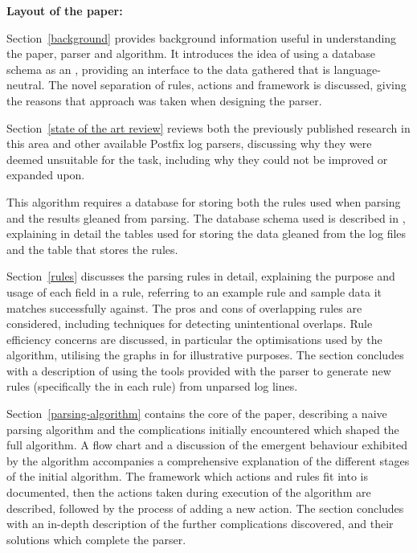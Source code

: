 \vspace{1em}\noindent\textbf{Layout of the paper:}

Section~\ref{background} provides background information useful in
understanding the paper, parser and algorithm.  It introduces the idea of
using a database schema as an \API{}, providing an interface to the data
gathered that is language-neutral.  The novel separation of rules, actions
and framework is discussed, giving the reasons that approach was taken when
designing the parser.

Section~\ref{state of the art review} reviews both the previously published
research in this area and other available Postfix log parsers, discussing
why they were deemed unsuitable for the task, including why they could not
be improved or expanded upon.

This algorithm requires a database for storing both the rules used when
parsing and the results gleaned from parsing.  The database schema used is
described in , explaining in detail the tables
used for storing the data gleaned from the log files and the table that
stores the rules.

Section~\ref{rules} discusses the parsing rules in detail, explaining the
purpose and usage of each field in a rule, referring to an example rule and
sample data it matches successfully against.  The pros and cons of
overlapping rules are considered, including techniques for detecting
unintentional overlaps.  Rule efficiency concerns are discussed, in
particular the optimisations used by the algorithm, utilising the graphs in
 for illustrative purposes.  The section concludes with
a description of using the tools provided with the parser to generate new
rules (specifically the \regex{} in each rule) from unparsed log lines.

Section~\ref{parsing-algorithm} contains the core of the paper, describing
a naive parsing algorithm and the complications initially encountered which
shaped the full algorithm.  A flow chart and a discussion of the emergent
behaviour exhibited by the algorithm accompanies a comprehensive
explanation of the different stages of the initial algorithm.  The
framework which actions and rules fit into is documented, then the actions
taken during execution of the algorithm are described, followed by the
process of adding a new action.  The section concludes with an in-depth
description of the further complications discovered, and their solutions
which complete the parser.

